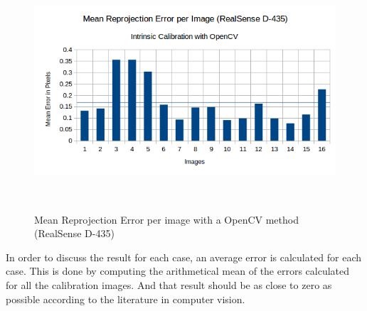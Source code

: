 \begin{figure}[!h]
\begin{center}
\includegraphics[width=5in, height=3.5in]{figures05/opencv_int_cal_real.png}
\caption{Mean Reprojection Error per image with a OpenCV method (RealSense D-435)}%
\label{fig:realopen}
\end{center}
\end{figure}

In order to discuss the result for each case, an average error is calculated for each case. This is done by computing the arithmetical mean of the errors calculated for all the calibration images. And that result should be as close to zero as possible according to the literature in computer vision.

